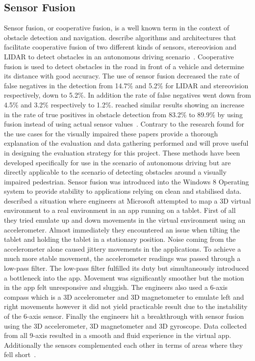 \documentclass[prodmode,acmtosem]{acmsmall} %
\begin{document}
\subsection{Sensor Fusion}
Sensor fusion, or cooperative fusion, is a well known term in the context of obstacle detection and navigation. \citet{Labayrade2005} describe algorithms and architectures that facilitate cooperative fusion of two different kinds of sensors, stereovision and LIDAR to detect obstacles in an autonomous driving scenario~\cite{Labayrade2005}. Cooperative fusion is used to detect obstacles in the road in front of a vehicle and determine its distance with good accuracy. The use of sensor fusion decreased the rate of false negatives in the detection from 14.7\% and 5.2\% for LIDAR and stereovision respectively, down to 5.2\%. In addition the rate of false negatives went down from 4.5\% and 3.2\% respectively to 1.2\%. \citet{Cho2014} reached similar results showing an increase in the rate of true positives in obstacle detection from 83.2\% to 89.9\% by using fusion instead of using actual sensor values~\cite{Cho2014}. Contrary to the research found for the use cases for the visually impaired these papers provide a thorough explanation of the evaluation and data gathering performed and will prove useful in designing the evaluation strategy for this project. These methods have been developed specifically for use in the scenario of autonomous driving but are directly applicable to the scenario of detecting obstacles around a visually impaired pedestrian. Sensor fusion was introduced into the Windows 8 Operating system to provide stability to applications relying on clean and stabilised data. \citet{Gear2012} described a situation where engineers at Microsoft attempted to map a 3D virtual environment to a real environment in an app running on a tablet. First of all they tried emulate up and down movements in the virtual environment using an accelerometer. Almost immediately they encountered an issue when tilting the tablet and holding the tablet in a stationary position. Noise coming from the accelerometer alone caused jittery movements in the applications. To achieve a much more stable movement, the accelerometer readings was passed through a low-pass filter. The low-pass filter fulfilled its duty but simultaneously introduced a bottleneck into the app. Movement was significantly smoother but the motion in the app felt unresponsive and sluggish. The engineers also used a 6-axis compass which is a 3D accelerometer and 3D magnetometer to emulate left and right movements however it did not yield practicable result due to the instability of the 6-axis sensor. Finally the engineers hit a breakthrough with sensor fusion using the 3D accelerometer, 3D magnetometer and 3D gyroscope. Data collected from all 9-axis resulted in a smooth and fluid experience in the virtual app. Additionally the sensors complemented each other in terms of areas where they fell short~\cite{Gear2012}.
\end{document}
